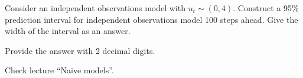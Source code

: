 
\begin{question}
Consider an independent observations model with \(u_t \sim (0, 4)\). Construct a 95\% prediction interval for independent observations model 100 steps ahead. Give the width of the interval as an answer.

Provide the answer with 2 decimal digits.
\end{question}

\begin{solution}
Check lecture ``Naive models''.
\end{solution}

